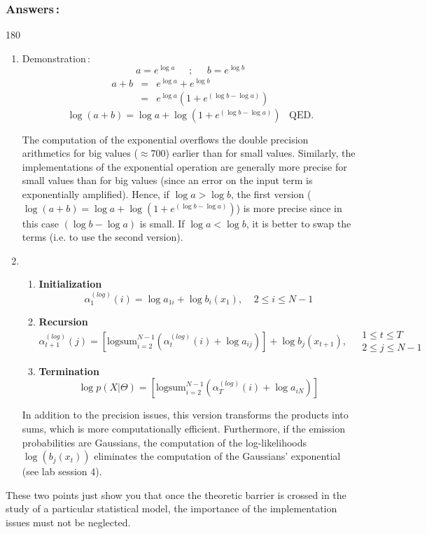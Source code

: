 \documentclass[twoside,a4paper,titlepage]{article}
\newcommand{\expl}[1]{%
\begin{turn}{180}%
\parbox{\textwidth}{\em #1}%
\end{turn}%
}
\begin{document}
\subsubsection*{Answers\,:}
\expl{
\begin{enumerate}
\item Demonstration\,:
\vspace{-1em}
\[ a = e^{\log a} \;\;\;\;\;;\;\;\;\;\; b = e^{\log b} \]
\vspace{-2em}
\begin{eqnarray}
a+b & = & e^{\log a} + e^{\log b} \nonumber \\
    & = & e^{\log a} \left( 1 + e^{(\log b - \log a)} \right) \nonumber
\end{eqnarray}
\vspace{-1.5em}
\[ \log(a+b) = \log a + \log \left( 1 + e^{(\log b - \log a)} \right) \;\;\; \mbox{QED.}\]

The computation of the exponential overflows the double precision
arithmetics for big values ($\approx700$) earlier than for small
values. Similarly, the implementations of the exponential operation are
generally more precise for small values than for big values (since an error
on the input term is exponentially amplified). Hence, if $\log a > \log b$,
the first version ($\log(a+b) = \log a + \log \left( 1 + e^{(\log b - \log
a)} \right)$) is more precise since in this case $(\log b - \log a)$ is
small. If $\log a < \log b$, it is better to swap the terms (i.e. to use
the second version).
%
\item
\begin{enumerate}
\item {\bf Initialization}
%
	\[
		\alpha_1^{(log)}(i) = \log a_{1i} + \log b_i(x_1), \;\;\;\; 2 \leq i \leq N-1
	\]
%
\item {\bf Recursion}
	\[
		\alpha_{t+1}^{(log)}(j) = \left[ \mbox{logsum}_{i=2}^{N-1} \left(
							\alpha_{t}^{(log)}(i) + \log a_{ij}
						\right) \right] + \log b_j(x_{t+1}),
		\;\;\;\; \begin{array}{l} 1 \leq t \leq T \\ 2 \leq j \leq N-1 \end{array}
	\]
\item {\bf Termination}
	\[
		\log p(X|\Theta) = \left[ \mbox{logsum}_{i=2}^{N-1} \left(
			\alpha_{T}^{(log)}(i) + \log a_{iN} \right) \right]
	\]
%
\end{enumerate}
In addition to the precision issues, this version transforms the products
into sums, which is more computationally efficient. Furthermore, if the
emission probabilities are Gaussians, the computation of the
log-likelihoods $\log(b_j(x_t))$ eliminates the computation of the
Gaussians' exponential (see lab session 4).
\end{enumerate}

These two points just show you that once the theoretic barrier is crossed
in the study of a particular statistical model, the importance of the
implementation issues must not be neglected.  }
\end{document}
